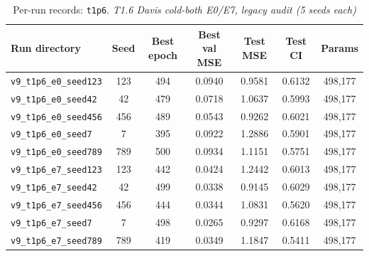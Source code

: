 \begin{table}[!h]
\centering\scriptsize
\caption{Per-run records: \texttt{t1p6}. \textit{T1.6 Davis cold-both E0/E7, legacy audit (5 seeds each)}}
\label{tab:v9_runs_t1p6}
\begin{tabular}{p{4.8cm}cccccc}
\toprule
Run directory & Seed & Best epoch & Best val MSE & Test MSE & Test CI & Params \\
\midrule
\texttt{v9\_\allowbreak{}t1p6\_\allowbreak{}e0\_\allowbreak{}seed123} & 123 & 494 & 0.0940 & 0.9581 & 0.6132 & 498,177 \\
\texttt{v9\_\allowbreak{}t1p6\_\allowbreak{}e0\_\allowbreak{}seed42} & 42 & 479 & 0.0718 & 1.0637 & 0.5993 & 498,177 \\
\texttt{v9\_\allowbreak{}t1p6\_\allowbreak{}e0\_\allowbreak{}seed456} & 456 & 489 & 0.0543 & 0.9262 & 0.6021 & 498,177 \\
\texttt{v9\_\allowbreak{}t1p6\_\allowbreak{}e0\_\allowbreak{}seed7} & 7 & 395 & 0.0922 & 1.2886 & 0.5901 & 498,177 \\
\texttt{v9\_\allowbreak{}t1p6\_\allowbreak{}e0\_\allowbreak{}seed789} & 789 & 500 & 0.0934 & 1.1151 & 0.5751 & 498,177 \\
\texttt{v9\_\allowbreak{}t1p6\_\allowbreak{}e7\_\allowbreak{}seed123} & 123 & 442 & 0.0424 & 1.2442 & 0.6013 & 498,177 \\
\texttt{v9\_\allowbreak{}t1p6\_\allowbreak{}e7\_\allowbreak{}seed42} & 42 & 499 & 0.0338 & 0.9145 & 0.6029 & 498,177 \\
\texttt{v9\_\allowbreak{}t1p6\_\allowbreak{}e7\_\allowbreak{}seed456} & 456 & 444 & 0.0344 & 1.0831 & 0.5620 & 498,177 \\
\texttt{v9\_\allowbreak{}t1p6\_\allowbreak{}e7\_\allowbreak{}seed7} & 7 & 498 & 0.0265 & 0.9297 & 0.6168 & 498,177 \\
\texttt{v9\_\allowbreak{}t1p6\_\allowbreak{}e7\_\allowbreak{}seed789} & 789 & 419 & 0.0349 & 1.1847 & 0.5411 & 498,177 \\
\bottomrule
\end{tabular}
\end{table}

